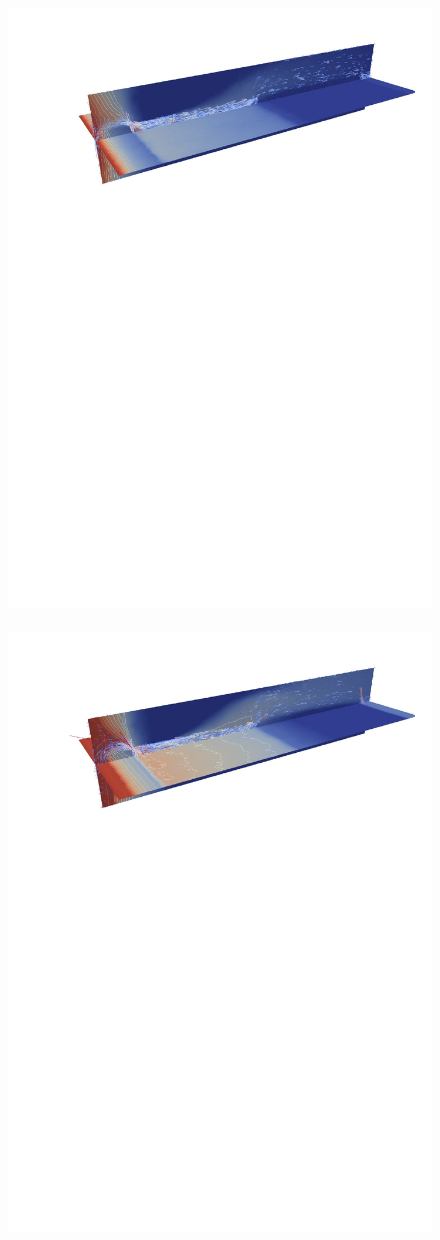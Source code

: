 \begin{figure}[ht]
{        \hbox{\hspace{-3.cm}
            \includegraphics[width=.70\textwidth]{./Pics1/3D_ChannelAdaptive/Test_SlowNewAdapt_60_ContourPlotSlice_b}
            \includegraphics[width=.70\textwidth]{./Pics1/3D_ChannelAdaptive/Test_SlowNewAdapt_120_ContourPlotSlice_b}}
}
\end{figure}
